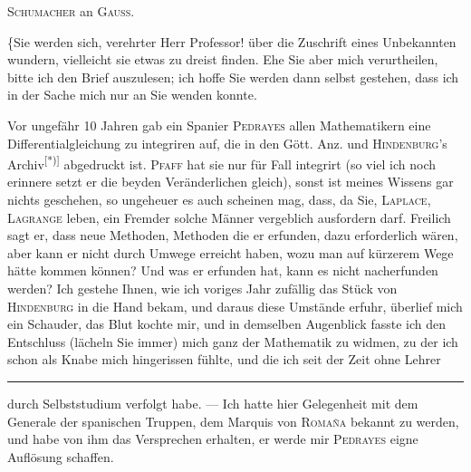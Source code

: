 \begingroup
{}
\begin{center}\textsc{Schumacher} an \textsc{Gauss}.\end{center}
\par\indent \{Sie werden sich, verehrter Herr Professor! über die Zuschrift eines Unbekannten wundern, vielleicht sie etwas zu dreist finden. Ehe Sie aber mich verurtheilen, bitte ich den Brief auszulesen; ich hoffe Sie werden dann selbst gestehen, dass ich in der Sache mich nur an Sie wenden konnte.

\par\indent Vor ungefähr 10 Jahren gab ein Spanier \textsc{Pedrayes} allen Mathematikern eine Differentialgleichung zu integriren auf, die in den Gött. Anz. und \textsc{Hindenburg}’s Archiv\textsuperscript{[*)]} abgedruckt ist. \textsc{Pfaff} hat sie nur für  Fall integrirt (so viel ich noch erinnere setzt er die beyden Veränderlichen gleich), sonst ist meines Wissens gar nichts geschehen, so ungeheuer es auch scheinen mag, dass, da Sie, \textsc{Laplace}, \textsc{Lagrange} leben, ein Fremder solche Männer vergeblich ausfordern darf. Freilich sagt er, dass neue Methoden, Methoden die er erfunden, dazu erforderlich wären, aber kann er nicht durch Umwege erreicht haben, wozu man auf kürzerem Wege hätte kommen können? Und was er erfunden hat, kann es nicht nacherfunden werden? Ich gestehe Ihnen, wie ich voriges Jahr zufällig das Stück von \textsc{Hindenburg} in die Hand bekam, und daraus diese Umstände erfuhr, überlief mich ein Schauder, das Blut kochte mir, und in demselben Augenblick fasste ich den Entschluss (lächeln Sie immer) mich ganz der Mathematik zu widmen, zu der ich schon als Knabe mich hingerissen fühlte, und die ich seit der Zeit ohne Lehrer
\par\vfill\noindent\rule{.25\linewidth}{.4pt}\par\smallskip
\begingroup\footnotesize{}\par\endgroup
\clearpage
{}
\noindent durch Selbststudium verfolgt habe. — Ich hatte hier Gelegenheit mit dem Generale der spanischen Truppen, dem Marquis von \textsc{Romaña} bekannt zu werden, und habe von ihm das Versprechen erhalten, er werde mir \textsc{Pedrayes} eigne Auflösung schaffen.

